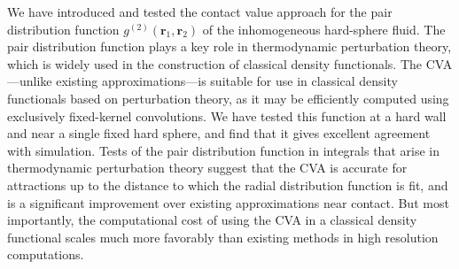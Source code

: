 \documentclass[letterpaper,twocolumn,amsmath,amssymb,pre,aps,10pt]{revtex4-1}
\newcommand{\rr}{\textbf{r}}
\begin{document}
We have introduced and tested the contact value approach for the pair
distribution function $g^{(2)}(\rr_1,\rr_2)$ of the inhomogeneous
hard-sphere fluid.  The pair distribution function plays a key role in
thermodynamic perturbation theory, which is widely used in the
construction of classical density functionals.  The CVA---unlike
existing approximations---is suitable for use in classical density
functionals based on perturbation theory, as it may be efficiently
computed using exclusively fixed-kernel convolutions.  We have tested
this function at a hard wall and near a single fixed hard sphere, and
find that it gives excellent agreement with simulation.  Tests of the
pair distribution function in integrals that arise in thermodynamic
perturbation theory suggest that the CVA is accurate for attractions
up to the distance to which the radial distribution function is fit,
and is a significant improvement over existing approximations near
contact.  But most importantly, the computational cost of using the
CVA in a classical density functional scales much more favorably than
existing methods in high resolution computations.

\end{document}
